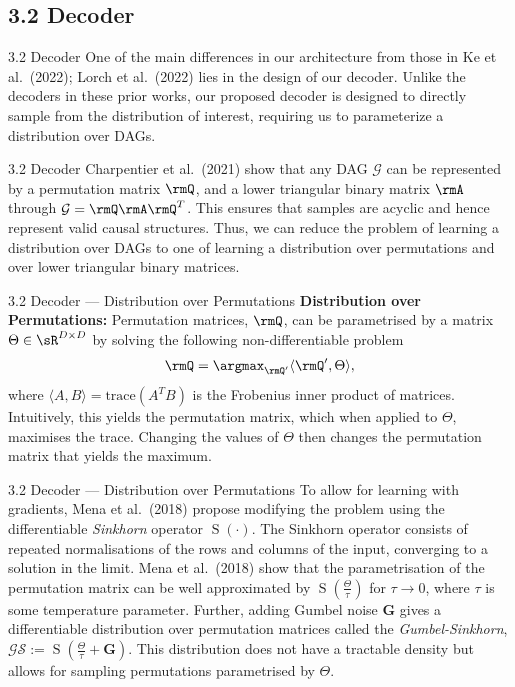 \documentclass[aspectratio=169,10pt]{beamer}
\begin{document}
\subsection{3.2 Decoder}

\begin{frame}{3.2 Decoder}
One of the main differences in our architecture from those in Ke et al.\ (2022); Lorch et al.\ (2022) lies in the design of our decoder. Unlike the decoders in these prior works, our proposed decoder is designed to directly sample from the distribution of interest, requiring us to parameterize a distribution over DAGs.
\end{frame}

\begin{frame}{3.2 Decoder}
Charpentier et al.\ (2021) show that any DAG $\mathcal{G}$ can be represented by a permutation matrix $\rmQ$, and a lower triangular binary matrix $\rmA$ through $\mathcal{G} = \rmQ \rmA \rmQ^T$. This ensures that samples are acyclic and hence represent valid causal structures. Thus, we can reduce the problem of learning a distribution over DAGs to one of learning a distribution over permutations and over lower triangular binary matrices.
\end{frame}

\begin{frame}{3.2 Decoder --- Distribution over Permutations}
\textbf{Distribution over Permutations:}\quad
Permutation matrices, $\rmQ$, can be parametrised by a matrix $\Theta \in \sR^{D \times D}$ by solving the following non-differentiable problem
\begin{align*}
    \rmQ = \argmax_{\rmQ^{\prime}} \langle \rmQ^{\prime}, \Theta   \rangle,
\end{align*}
where $\langle A, B \rangle = \text{trace}(A^T B)$ is the Frobenius inner product of matrices. Intuitively, this yields the permutation matrix, which when applied to $\Theta$, maximises the trace. Changing the values of $\Theta$ then changes the permutation matrix that yields the maximum.
\end{frame}

\begin{frame}{3.2 Decoder --- Distribution over Permutations}
\small
To allow for learning with gradients, Mena et al.\ (2018) propose modifying the problem using the differentiable \textit{Sinkhorn} operator $\operatorname{S}(\cdot)$. The Sinkhorn operator consists of repeated normalisations of the rows and columns of the input, converging to a solution in the limit. Mena et al.\ (2018) show that the parametrisation of the permutation matrix can be well approximated by $\operatorname{S}\left(\frac{\Theta}{\tau}\right)$ for $\tau \to 0$, where $\tau$ is some temperature parameter. Further, adding Gumbel noise $\mathbf{G}$ gives a differentiable distribution over permutation matrices called the \textit{Gumbel-Sinkhorn}, $\mathcal{GS}:=\operatorname{S}\left(\frac{\Theta}{\tau} + \mathbf{G}\right)$. This distribution does not have a tractable density but allows for sampling permutations parametrised by $\Theta$.
\end{frame}
\end{document}
